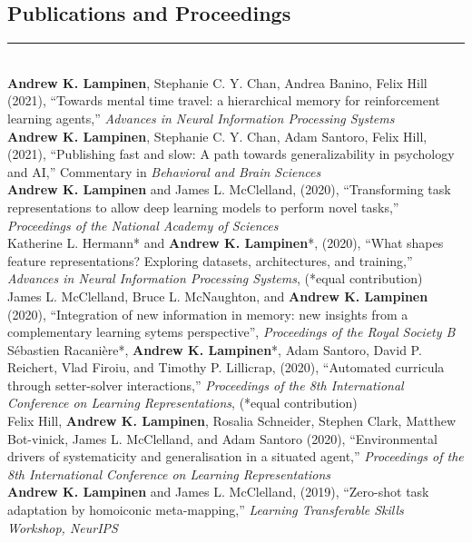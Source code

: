 \documentclass[margin]{res}
\begin{document}
\begin{resume}
\vspace{1pt}\section{Publications and Proceedings} \vspace{-15pt} \rule{\textwidth}{0.5pt} \\[3pt]
\textbf{Andrew K. Lampinen}, Stephanie C. Y. Chan, Andrea Banino, Felix Hill (2021), {``Towards mental time travel: a hierarchical memory for reinforcement learning agents,''} \textit{Advances in Neural Information Processing Systems} \\[3pt] 
\textbf{Andrew K. Lampinen}, Stephanie C. Y. Chan, Adam Santoro, Felix Hill, (2021), {``Publishing fast and slow: A path towards generalizability in psychology and AI,''} Commentary in \textit{Behavioral and Brain Sciences} \\[3pt] 
\textbf{Andrew K. Lampinen} and James L. McClelland, (2020), {``Transforming task representations to allow deep learning models to perform novel tasks,''} \textit{Proceedings of the National Academy of Sciences} \\[3pt] 
Katherine L. Hermann* and \textbf{Andrew K. Lampinen}*, (2020), {``What shapes feature representations? Exploring datasets, architectures, and training,''} \textit{Advances in Neural Information Processing Systems}, (*equal contribution) \\[3pt] 
James L. McClelland, Bruce L. McNaughton, and \textbf{Andrew K. Lampinen} (2020), {``Integration of new information in memory: new insights from a complementary learning sytems perspective''}, \textit{Proceedings of the Royal Society B} \\[3pt]
S\'ebastien Racani\`ere*, \textbf{Andrew K. Lampinen}*, Adam Santoro, David P. Reichert, Vlad Firoiu, and Timothy P. Lillicrap, (2020), {``Automated curricula through setter-solver interactions,''} \textit{Proceedings of the 8th International Conference on Learning Representations}, (*equal contribution) \\ [3pt] 
Felix Hill, \textbf{Andrew K. Lampinen}, Rosalia Schneider, Stephen Clark, Matthew Bot-vinick, James L. McClelland, and Adam Santoro (2020), {``Environmental drivers of systematicity and generalisation in a situated agent,''} \textit{Proceedings of the 8th International Conference on Learning Representations} \\ [3pt] 
\textbf{Andrew K. Lampinen} and James L. McClelland, (2019), {``Zero-shot task adaptation by homoiconic meta-mapping,''} \textit{Learning Transferable Skills Workshop, NeurIPS} \\ [3pt] 

\end{resume}
\end{document}
